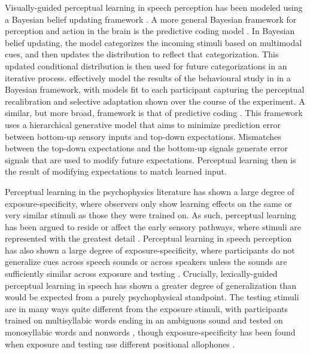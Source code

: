 Visually-guided perceptual learning in speech perception has been modeled using a Bayesian belief updating framework \citep{Kleinschmidt2011}.  
A more general Bayesian framework for perception and action in the brain is the predictive coding model \citep{Clark2013}.
In Bayesian belief updating, the model categorizes the incoming stimuli based on multimodal cues, and then updates the distribution to reflect that categorization.  
This updated conditional distribution is then used for future categorizations in an iterative process.  
\citet{Kleinschmidt2011} effectively model the results of the behavioural study in \citet{Vroomen2007} in a Bayesian framework, with models fit to each participant capturing the perceptual recalibration and selective adaptation shown over the course of the experiment.  
A similar, but more broad, framework is that of predictive coding \citep{Clark2013}. 
This framework uses a hierarchical generative model that aims to minimize prediction error between bottom-up sensory inputs and top-down expectations.  
Mismatches between the top-down expectations and the bottom-up signals generate error signals that are used to modify future expectations.  
Perceptual learning then is the result of modifying expectations to match learned input.

Perceptual learning in the psychophysics literature has shown a large degree of exposure-specificity, where observers only show learning effects on the same or very similar stimuli as those they were trained on. 
As such, perceptual learning has been argued to reside or affect the early sensory pathways, where stimuli are represented with the greatest detail \citep{Gilbert2001}.  
Perceptual learning in speech perception has also shown a large degree of exposure-specificity, where participants do not generalize cues across speech sounds \citep{Reinisch2014} or across speakers unless the sounds are sufficiently similar across exposure and testing \citep{Eisner2005, Kraljic2005, Kraljic2007, Reinisch2013a}.  
Crucially, lexically-guided perceptual learning in speech has shown a greater degree of generalization than would be expected from a purely psychophysical standpoint.  
The testing stimuli are in many ways quite different from the exposure stimuli, with participants trained on multisyllabic words ending in an ambiguous sound and tested on monosyllabic words \citep{Reinisch2013} and nonwords \citep{Norris2003, Kraljic2005}, though exposure-specificity has been found when exposure and testing use different positional allophones \citep{Mitterer2013}.

